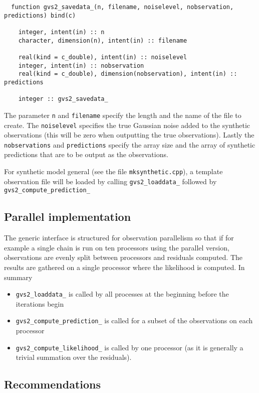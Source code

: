\documentclass{article}
\begin{document}
\begin{verbatim}
  function gvs2_savedata_(n, filename, noiselevel, nobservation, predictions) bind(c)

    integer, intent(in) :: n
    character, dimension(n), intent(in) :: filename

    real(kind = c_double), intent(in) :: noiselevel
    integer, intent(in) :: nobservation
    real(kind = c_double), dimension(nobservation), intent(in) :: predictions

    integer :: gvs2_savedata_
\end{verbatim}

The parameter {\tt n} and {\tt filename} specify the length and the name
of the file to create. The {\tt noiselevel} specifies the true Gaussian
noise added to the synthetic observations (this will be zero when
outputting the true observations). Lastly the {\tt nobservations} and
{\tt predictions} specify the array size and the array of synthetic
predictions that are to be output as the observations.

For synthetic model general (see the file {\tt mksynthetic.cpp}), a
template observation file will be loaded by calling {\tt gvs2\_loaddata\_}
followed by {\tt gvs2\_compute\_prediction\_} 

\subsection{Parallel implementation}

The generic interface is structured for observation parallelism so that if for example
a single chain is run on ten processors using the parallel version, observations are
evenly split between processors and residuals computed. The results are gathered on
a single processor where the likelihood is computed. In summary

\begin{itemize}
\item {\tt gvs2\_loaddata\_} is called by all processes at the beginning before
  the iterations begin
\item {\tt gvs2\_compute\_prediction\_} is called for a subset of the observations
  on each processor
\item {\tt gvs2\_compute\_likelihood\_} is called by one processor (as it is
  generally a trivial summation over the residuals).
\end{itemize}

\subsection{Recommendations}
\end{document}
